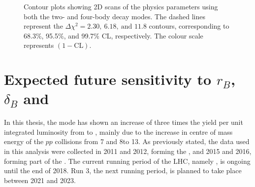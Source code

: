\begin{figure}[h]
\centering
{}
\caption{Contour plots showing 2D scans of the physics parameters using both the two- and four-body \Dz decay modes. The dashed lines represent the $\Delta \chi^2 = 2.30,\ 6.18,\ \text{and } 11.8$ contours, corresponding to 68.3\%, 95.5\%, and 99.7\% CL, respectively. The colour scale represents $(1 - \text{CL})$.}
\label{gammadiniplotsallmodes}
\end{figure}

\section{Expected future sensitivity to $r_B$, $\delta_B$ and \Pgamma}
\label{sec:interpretation:futuresensitivity}

In this thesis, the \btodkst mode has shown an increase of three times the yield per unit integrated luminosity from \runone to \runtwo, mainly due to the increase in centre of mass energy of the $pp$ collisions from 7 and 8\tev to 13\tev. As previously stated, the data used in this analysis were collected in 2011 and 2012, forming the \runone \dataset, and 2015 and 2016, forming part of the \runtwo \dataset. The current running period of the LHC, namely \runtwo, is ongoing until the end of 2018. Run 3, the next running period, is planned to take place between 2021 and 2023.

